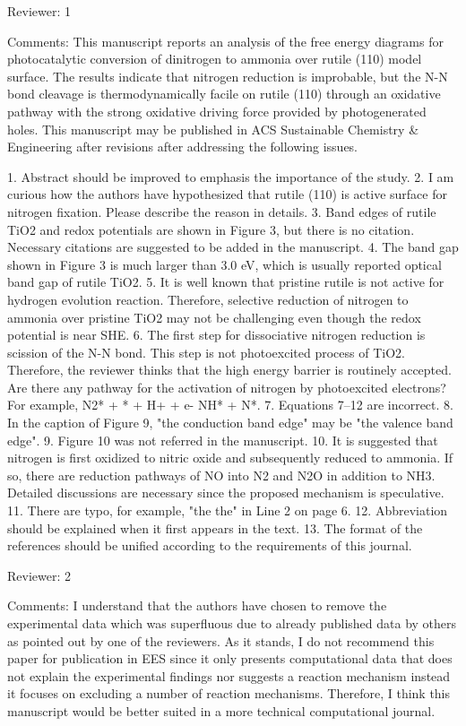 Reviewer: 1

Comments:
This manuscript reports an analysis of the free energy diagrams for photocatalytic conversion of dinitrogen to ammonia over rutile (110) model surface. The results indicate that nitrogen reduction is improbable, but the N-N bond cleavage is thermodynamically facile on rutile (110) through an oxidative pathway with the strong oxidative driving force provided by photogenerated holes. This manuscript may be published in ACS Sustainable Chemistry & Engineering after revisions after addressing the following issues.

1. Abstract should be improved to emphasis the importance of the study.
2. I am curious how the authors have hypothesized that rutile (110) is active surface for nitrogen fixation. Please describe the reason in details.
3. Band edges of rutile TiO2 and redox potentials are shown in Figure 3, but there is no citation. Necessary citations are suggested to be added in the manuscript.
4. The band gap shown in Figure 3 is much larger than 3.0 eV, which is usually reported optical band gap of rutile TiO2.
5. It is well known that pristine rutile is not active for hydrogen evolution reaction. Therefore, selective reduction of nitrogen to ammonia over pristine TiO2 may not be challenging even though the redox potential is near SHE.
6. The first step for dissociative nitrogen reduction is scission of the N-N bond. This step is not photoexcited process of TiO2. Therefore, the reviewer thinks that the high energy barrier is routinely accepted. Are there any pathway for the activation of nitrogen by photoexcited electrons? For example, N2* + * + H+ + e-  NH* + N*.
7. Equations 7–12 are incorrect.
8. In the caption of Figure 9, "the conduction band edge" may be "the valence band edge".
9. Figure 10 was not referred in the manuscript.
10. It is suggested that nitrogen is first oxidized to nitric oxide and subsequently reduced to ammonia. If so, there are reduction pathways of NO into N2 and N2O in addition to NH3. Detailed discussions are necessary since the proposed mechanism is speculative.
11. There are typo, for example, "the the" in Line 2 on page 6.
12. Abbreviation should be explained when it first appears in the text.
13. The format of the references should be unified according to the requirements of this journal.



Reviewer: 2

Comments:
I understand that the authors have chosen to remove the experimental data which was superfluous due to already published data by others as pointed out by one of the reviewers. As it stands, I do not recommend this paper for publication in EES since it only presents computational data that does not explain the experimental findings nor suggests a reaction mechanism instead it focuses on excluding a number of reaction mechanisms. Therefore, I think this manuscript would be better suited in a more technical computational journal.


